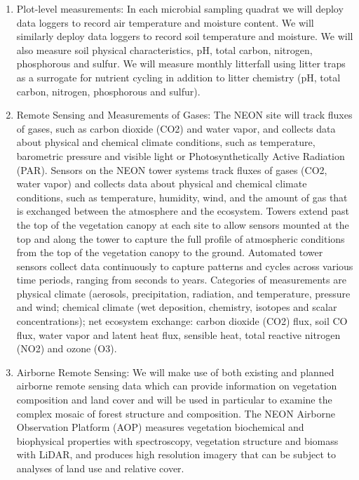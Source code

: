\documentclass[11pt]{article}
\begin{document}
\begin{enumerate}
\item Plot-level measurements: In each microbial sampling quadrat we
  will deploy data loggers to record air temperature and moisture
  content.  We will similarly deploy data loggers to record soil
  temperature and moisture.  We will also measure soil physical
  characteristics, pH, total carbon, nitrogen, phosphorous and sulfur.
  We will measure monthly litterfall using litter traps as a surrogate
  for nutrient cycling \citep{XXXX} in addition to litter chemistry
  (pH, total carbon, nitrogen, phosphorous and sulfur).
\item Remote Sensing and Measurements of Gases: The NEON site will
  track fluxes of gases, such as carbon dioxide (CO2) and water vapor,
  and collects data about physical and chemical climate conditions,
  such as temperature, barometric pressure and visible light or
  Photosynthetically Active Radiation (PAR). Sensors on the NEON tower
  systems track fluxes of gases (CO2, water vapor) and collects data
  about physical and chemical climate conditions, such as temperature,
  humidity, wind, and the amount of gas that is exchanged between the
  atmosphere and the ecosystem. Towers extend past the top of the
  vegetation canopy at each site to allow sensors mounted at the top
  and along the tower to capture the full profile of atmospheric
  conditions from the top of the vegetation canopy to the
  ground. Automated tower sensors collect data continuously to capture
  patterns and cycles across various time periods, ranging from
  seconds to years. Categories of measurements are physical climate
  (aerosols, precipitation, radiation, and temperature, pressure and
  wind; chemical climate (wet deposition, chemistry, isotopes and
  scalar concentrations); net ecosystem exchange: carbon dioxide (CO2)
  flux, soil CO flux, water vapor and latent heat flux, sensible heat,
  total reactive nitrogen (NO2) and ozone (O3).
\item Airborne Remote Sensing: We will make use of both existing and
  planned airborne remote sensing data which can provide information
  on vegetation composition and land cover and will be used in
  particular to examine the complex mosaic of forest structure and
  composition. The NEON Airborne Observation Platform (AOP) measures
  vegetation biochemical and biophysical properties with spectroscopy,
  vegetation structure and biomass with LiDAR, and produces high
  resolution imagery that can be subject to analyses of land use and
  relative cover.
\end{enumerate}
\end{document}

